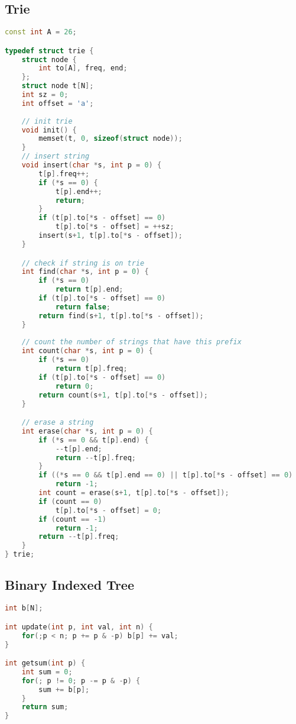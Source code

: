 \documentclass{article}
\begin{document}
\subsection{Trie}
\begin{lstlisting}[language=C++]
const int A = 26;

typedef struct trie {
	struct node {
		int to[A], freq, end;
	};
	struct node t[N];
	int sz = 0;
	int offset = 'a';
	
	// init trie
	void init() {
		memset(t, 0, sizeof(struct node));
	}
	// insert string
	void insert(char *s, int p = 0) {
		t[p].freq++;
		if (*s == 0) {
			t[p].end++;
			return;
		}
		if (t[p].to[*s - offset] == 0)
			t[p].to[*s - offset] = ++sz;
		insert(s+1, t[p].to[*s - offset]);
	}

	// check if string is on trie
	int find(char *s, int p = 0) {
		if (*s == 0)
			return t[p].end;
		if (t[p].to[*s - offset] == 0)
			return false;
		return find(s+1, t[p].to[*s - offset]);
	}
	
	// count the number of strings that have this prefix
	int count(char *s, int p = 0) {
		if (*s == 0)
			return t[p].freq;
		if (t[p].to[*s - offset] == 0)
			return 0;
		return count(s+1, t[p].to[*s - offset]);
	}

	// erase a string
	int erase(char *s, int p = 0) {
		if (*s == 0 && t[p].end) {
			--t[p].end;
			return --t[p].freq;
		}
		if ((*s == 0 && t[p].end == 0) || t[p].to[*s - offset] == 0)
			return -1;
		int count = erase(s+1, t[p].to[*s - offset]);
		if (count == 0)
			t[p].to[*s - offset] = 0;
		if (count == -1)
			return -1;
		return --t[p].freq;
	}
} trie;
\end{lstlisting}
\subsection{Binary Indexed Tree}
\begin{lstlisting}[language=C++]
int b[N];

int update(int p, int val, int n) {
	for(;p < n; p += p & -p) b[p] += val;
}

int getsum(int p) {
	int sum = 0;
	for(; p != 0; p -= p & -p) {
		sum += b[p];
	}
	return sum;
}
\end{lstlisting}
\end{document}
